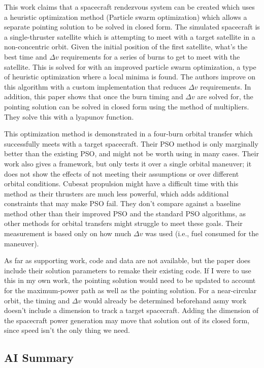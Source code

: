 \documentclass[11pt]{article}
\begin{document}
This work claims that a spacecraft rendezvous system can be created which uses a heuristic optimization method (Particle swarm optimization) which allows a separate pointing solution to be solved in closed form. The simulated spacecraft is a single-thruster satellite which is attempting to meet with a target satellite in a non-concentric orbit. Given the initial position of the first satellite, what's the best time and $\Delta v$ requirements for a series of burns to get to meet with the satellite. This is solved for with an improved particle swarm optimization, a type of heuristic optimization where a local minima is found. The authors improve on this algorithm with a custom implementation that reduces $\Delta v$ requirements. In addition, this paper shows that once the burn timing and $\Delta v$ are solved for, the pointing solution can be solved in closed form using the method of multipliers. They solve this with a lyapunov function. 

This optimization method is demonstrated in a four-burn orbital transfer which successfully meets with a target spacecraft. Their PSO method is only marginally better than the existing PSO, and might not be worth using in many cases. Their work also gives a framework, but only tests it over a single orbital maneuver; it does not show the effects of not meeting their assumptions or over different orbital conditions. Cubesat propulsion might have a difficult time with this method as their thrusters are much less powerful, which adds additional constraints that may make PSO fail. They don't compare against a baseline method other than their improved PSO and the standard PSO algorithms, as other methods for orbital transfers might struggle to meet these goals. Their measurement is based only on how much $\Delta v$ was used (i.e., fuel consumed for the maneuver).

As far as supporting work, code and data are not available, but the paper does include their solution parameters to remake their existing code. If I were to use this in my own work, the pointing solution would need to be updated to account for the maximum-power path as well as the pointing solution. For a near-circular orbit, the timing and $\Delta v$ would already be determined beforehand asmy work doesn't include a dimension to track a target spacecraft. Adding the dimension of the spacecraft power generation may move that solution out of its closed form, since speed isn't the only thing we need.

\subsection{AI Summary}
\end{document}
